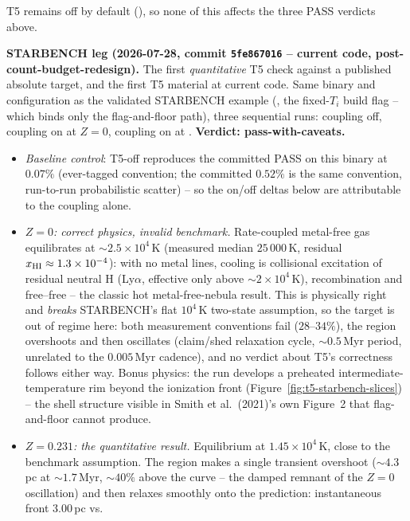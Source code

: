 T5 remains off by default (),
so none of this affects the three PASS verdicts above.

\textbf{STARBENCH leg (2026-07-28, commit \texttt{5fe867016} -- current
code, post-count-budget-redesign).} The first \emph{quantitative} T5
check against a published absolute target, and the first T5 material
at current code. Same binary and configuration as the validated
STARBENCH example (, the fixed-$T_i$ build flag --
which binds only the flag-and-floor path), three sequential runs:
coupling off, coupling on at $Z=0$, coupling on at
. \textbf{Verdict: pass-with-caveats.}

\begin{itemize}
\item \emph{Baseline control}: T5-off reproduces the committed PASS on
  this binary at $0.07\%$ (ever-tagged convention; the committed
  $0.52\%$ is the same convention, run-to-run probabilistic scatter) --
  so the on/off deltas below are attributable to the coupling alone.
\item \emph{$Z=0$: correct physics, invalid benchmark.} Rate-coupled
  metal-free gas equilibrates at $\sim\!2.5\times10^4\,$K (measured
  median $25\,000\,$K, residual $x_{\rm HI}\approx1.3\times10^{-4}$):
  with no metal lines, cooling is collisional excitation of residual
  neutral H (Ly$\alpha$, effective only above $\sim\!2\times10^4\,$K),
  recombination and free--free -- the classic hot metal-free-nebula
  result. This is physically right and \emph{breaks} STARBENCH's flat
  $10^4\,$K two-state assumption, so the target is out of regime here:
  both measurement conventions fail ($28$--$34\%$), the region
  overshoots and then oscillates (claim/shed relaxation cycle,
  $\sim\!0.5\,$Myr period, unrelated to the $0.005\,$Myr cadence), and
  no verdict about T5's correctness follows either way. Bonus physics:
  the run develops a preheated intermediate-temperature rim beyond the
  ionization front (Figure~\ref{fig:t5-starbench-slices}) --
  the shell structure visible in Smith et al.\ (2021)'s own Figure~2
  that flag-and-floor cannot produce.
\item \emph{$Z=0.231$: the quantitative result.} Equilibrium at
  $1.45\times10^4\,$K, close to the benchmark assumption. The region
  makes a single transient overshoot ($\sim\!4.3\,$pc at
  $\sim\!1.7\,$Myr, $\sim\!40\%$ above the curve -- the damped remnant
  of the $Z=0$ oscillation) and then relaxes smoothly onto the
  prediction: instantaneous front $3.00\,$pc vs.\

\end{itemize}
